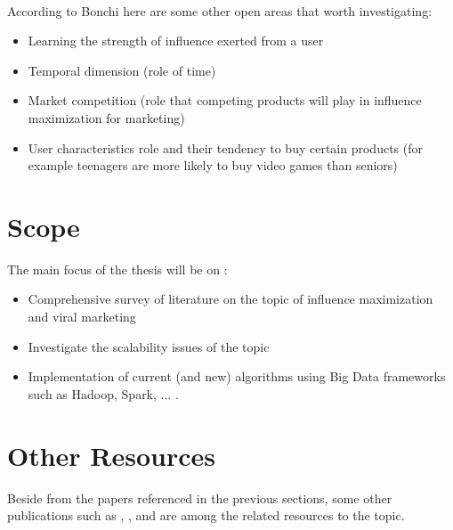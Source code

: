 \documentclass[english]{tktltiki}
\begin{document}
\\
According to Bonchi \cite{Bon11} here are some other open areas that worth investigating:
\begin{itemize}
\item Learning the strength of influence exerted from a user
\item Temporal dimension (role of time)
\item Market competition (role that competing products will play in influence maximization for marketing)
\item User characteristics role and their tendency to buy certain products (for example teenagers are more likely to buy video games than seniors)
\end{itemize}
\section{Scope}
The main focus of the thesis will be on :
\begin{itemize}
\item Comprehensive survey of literature on the topic of influence maximization and viral marketing 
\item Investigate the scalability issues of the topic
\item Implementation of current (and new) algorithms using Big Data frameworks  such as Hadoop, Spark, ... .
\end{itemize}

\section{Other Resources}
Beside from the papers referenced in the previous sections, some other publications such as \cite{domingo02}, \cite{goyal10}, and \cite{cheng13} are among the related resources to the topic. 
\pagebreak



\lastpage

\pagestyle{empty}
\end{document}
